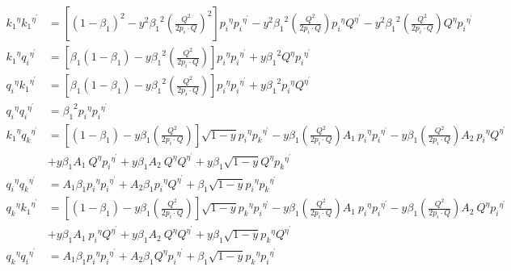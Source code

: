 \begin{equation}
\begin{split}
{k_1}^{{\eta}}{k_1}^{{\eta}^{\prime}}&=[(1-\beta_1)^2-y^2 {\beta_1}^2 (\frac{Q^2}{2p_i \cdot Q})^2] {p_i}^{{\eta}}{p_i}^{{\eta}^{\prime}}-y^2 {\beta_1}^2 (\frac{Q^2}{2p_i \cdot Q}){p_i}^{{\eta}}{Q}^{{\eta}^{\prime}}-y^2 {\beta_1}^2 (\frac{Q^2}{2p_i \cdot Q}){Q}^{{\eta}}{p_i}^{{\eta}^{\prime}}\\
{k_1}^{{\eta}}{q_i}^{{\eta}^{\prime}}&=[\beta_1(1-\beta_1)-y {\beta_1}^2 (\frac{Q^2}{2p_i \cdot Q})] {p_i}^{{\eta}}{p_i}^{{\eta}^{\prime}}+y {\beta_1}^2 {Q}^{{\eta}}{p_i}^{{\eta}^{\prime}}\\
{q_i}^{{\eta}}{k_1}^{{\eta}^{\prime}}&=[\beta_1(1-\beta_1)-y {\beta_1}^2 (\frac{Q^2}{2p_i \cdot Q})] {p_i}^{{\eta}}{p_i}^{{\eta}^{\prime}}+y {\beta_1}^2 {p_i}^{{\eta}}{Q}^{{\eta}^{\prime}}\\
{q_i}^{{\eta}}{q_i}^{{\eta}^{\prime}}&={\beta_1}^2 {p_i}^{{\eta}}{p_i}^{{\eta}^{\prime}}\\
{k_1}^{{\eta}}{q_k}^{{\eta}^{\prime}}&= [(1-\beta_1)-y\beta_1 (\frac{Q^2}{2p_i \cdot Q})] \sqrt{1-y}{p_i}^{{\eta}}{{p_k}^{{\eta}^{\prime}}}-y {\beta_1} (\frac{Q^2}{2p_i \cdot Q}) A_1 \:{p_i}^{{\eta}}{p_i}^{{\eta}^{\prime}}
-y {\beta_1} (\frac{Q^2}{2p_i \cdot Q}) A_2\: {p_i}^{{\eta}}{Q}^{{\eta}^{\prime}}\\
&+y {\beta_1} A_1 \:{Q}^{{\eta}}{p_i}^{{\eta}^{\prime}}+y {\beta_1} A_2 \:{Q}^{{\eta}}{Q}^{{\eta}^{\prime}}+y {\beta_1}\sqrt{1-y}{Q}^{{\eta}}{{p_k}^{{\eta}^{\prime}}}\\
{q_i}^{{\eta}}{q_k}^{{\eta}^{\prime}}&=A_1\beta_1 {p_i}^{{\eta}}{{p_i}^{{\eta}^{\prime}}}+A_2\beta_1 {p_i}^{{\eta}}{{Q}^{{\eta}^{\prime}}}+\beta_1 \sqrt{1-y}{p_i}^{{\eta}}{{p_k}^{{\eta}^{\prime}}}\\
{q_k}^{\eta}{k_1}^{{{\eta}}^{\prime}}&=[(1-\beta_1)-y\beta_1 (\frac{Q^2}{2p_i \cdot Q})] \sqrt{1-y}{p_k}^{{\eta}}{{p_i}^{{\eta}^{\prime}}}-y {\beta_1} (\frac{Q^2}{2p_i \cdot Q}) A_1 \:{p_i}^{{\eta}}{p_i}^{{\eta}^{\prime}}
-y {\beta_1} (\frac{Q^2}{2p_i \cdot Q}) A_2\: {Q}^{{\eta}}{p_i}^{{\eta}^{\prime}}\\
&+y {\beta_1} A_1 \:{p_i}^{{\eta}}{Q}^{{\eta}^{\prime}}+y {\beta_1} A_2 \:{Q}^{{\eta}}{Q}^{{\eta}^{\prime}}+y {\beta_1}\sqrt{1-y}{p_k}^{{\eta}}{{Q}^{{\eta}^{\prime}}}\\
{q_k}^{\eta}{q_i}^{{{\eta}}^{\prime}}&=A_1\beta_1 {p_i}^{{\eta}}{{p_i}^{{\eta}^{\prime}}}+A_2\beta_1 {Q}^{{\eta}}{{p_i}^{{\eta}^{\prime}}}+\beta_1 \sqrt{1-y}{p_k}^{{\eta}}{{p_i}^{{\eta}^{\prime}}}\\
\end{split}
\end{equation}

